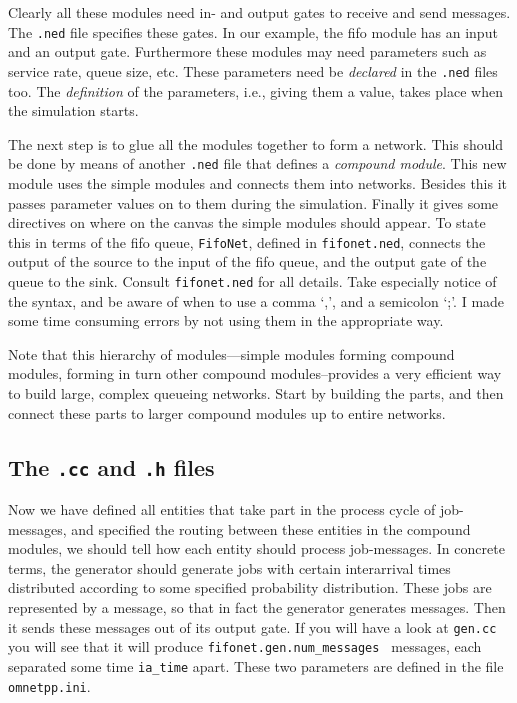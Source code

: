 \documentclass[a4paper]{article}
\begin{document}
Clearly all these modules need in- and output gates to receive and
send messages. The \texttt{.ned} file specifies these gates. In our
example, the fifo module has an input and an output gate. Furthermore
these modules may need parameters such as service rate, queue size,
etc. These parameters need be \emph{declared}  in the \texttt{.ned} files
too. The \emph{definition} of the parameters, i.e., giving them a
value, takes place when the simulation starts.

The next step is to glue all the modules together to form a network.
This should be done by means of another \texttt{.ned} file that
defines a \emph{compound module}. This new module uses the simple
modules and connects them into networks. Besides this it passes
parameter values on to them during the simulation. Finally it gives
some directives on where on the canvas the simple modules should
appear. To state this in terms of the fifo queue, \texttt{FifoNet},
defined in \texttt{fifonet.ned}, connects the output of the source to
the input of the fifo queue, and the output gate of the queue to the
sink. Consult \texttt{fifonet.ned} for all details. Take especially
notice of the syntax, and be aware of when to use a comma `,', and a
semicolon `;'. I made some time consuming errors by not using them in
the appropriate way. 

Note that this hierarchy of
modules---simple modules forming compound modules, forming in turn
other compound modules--provides a very efficient way to build large,
complex queueing networks. Start by building the parts, and then
connect these parts to larger compound modules up to entire networks.

\subsection{The \texttt{.cc} and \texttt{.h} files}
\label{sec:texttt.cc-texttt.h-f}
Now we have defined all entities that take part in the process cycle
of job-messages, and specified the routing between these entities in
the compound modules, we should tell how each entity should process
job-messages. In concrete terms, the generator should generate jobs
with certain interarrival times distributed according to some
specified probability distribution. These jobs are represented by a
message, so that in fact the generator generates messages. Then it
sends these messages out of its output gate. If you will have a look
at \texttt{gen.cc} you will see that it will produce
\texttt{fifonet.gen.num\_messages } messages, each separated some time
\texttt{ia\_time} apart. These two parameters are defined in the file
\texttt{omnetpp.ini}.
\end{document}
